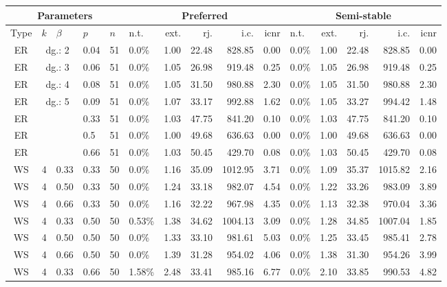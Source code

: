 \documentclass[parskip=half]{scrartcl}
\begin{document}
\begin{sidewaystable}
\begin{tabular}[h]{|c|r|l|l|l|l|r|r|r|r|l|r|r|r|r|} %
\hline
\multicolumn{5}{|c|}{Parameters} & \multicolumn{5}{|c|}{Preferred} & \multicolumn{5}{|c|}{Semi-stable} \\
\hline
Type & $k$ & $\beta$ & $p$ & $n$ & n.t. & ext. & rj. & i.c. & icnr & n.t. & ext. & rj. & i.c. & icnr \\
\hline
ER & \multicolumn{2}{|c|}{dg.: 2} & 0.04 & 51 & 0.0\% & 1.00 & 22.48 & 828.85 & 0.00 & 0.0\%  & 1.00 & 22.48 & 828.85 & 0.00\\
ER & \multicolumn{2}{|c|}{dg.: 3} & 0.06 & 51 & 0.0\% & 1.05 & 26.98 & 919.48 & 0.25 & 0.0\%  & 1.05 & 26.98 & 919.48 & 0.25\\
ER & \multicolumn{2}{|c|}{dg.: 4} & 0.08 & 51 & 0.0\% & 1.05 & 31.50 & 980.88 & 2.30 & 0.0\%  & 1.05 & 31.50 & 980.88 & 2.30\\
ER & \multicolumn{2}{|c|}{dg.: 5} & 0.09 & 51 & 0.0\% & 1.07 & 33.17 & 992.88 & 1.62 & 0.0\%  & 1.05 & 33.27 & 994.42 & 1.48\\
ER & \multicolumn{2}{|c|}{} & 0.33 & 51 & 0.0\% & 1.03 & 47.75 & 841.20 & 0.10 & 0.0\%  & 1.03 & 47.75 & 841.20 & 0.10\\
ER & \multicolumn{2}{|c|}{} & 0.5 & 51 & 0.0\% & 1.00 & 49.68 & 636.63 & 0.00 & 0.0\%  & 1.00 & 49.68 & 636.63 & 0.00\\
ER & \multicolumn{2}{|c|}{} & 0.66 & 51 & 0.0\% & 1.03 & 50.45 & 429.70 & 0.08 & 0.0\%  & 1.03 & 50.45 & 429.70 & 0.08\\
\hline
WS & 4 & 0.33 & 0.33 & 50 &  0.0\% & 1.16 & 35.09 & 1012.95 & 3.71 & 0.0\% & 1.09 & 35.37 & 1015.82 & 2.16\\
WS & 4 & 0.50 & 0.33 & 50 &  0.0\% & 1.24 & 33.18 & 982.07 & 4.54 & 0.0\%  & 1.22 & 33.26 & 983.09 & 3.89\\
WS & 4 & 0.66 & 0.33 & 50 &  0.0\% & 1.16 & 32.22 & 967.98 & 4.35 & 0.0\%  & 1.13 & 32.38 & 970.04 & 3.36\\
WS & 4 & 0.33 & 0.50 & 50 & 0.53\% & 1.38 & 34.62 & 1004.13 & 3.09 & 0.0\% & 1.28 & 34.85 & 1007.04 & 1.85\\
WS & 4 & 0.50 & 0.50 & 50 &  0.0\% & 1.33 & 33.10 & 981.61 & 5.03 & 0.0\%  & 1.25 & 33.45 & 985.41 & 2.78\\
WS & 4 & 0.66 & 0.50 & 50 &  0.0\% & 1.39 & 31.28 & 954.02 & 4.06 & 0.0\%  & 1.38 & 31.30 & 954.26 & 3.99\\
WS & 4 & 0.33 & 0.66 & 50 & 1.58\% & 2.48 & 33.41 & 985.16 & 6.77 & 0.0\%  & 2.10 & 33.85 & 990.53 & 4.82\\

\end{tabular}
\end{sidewaystable}
\end{document}
